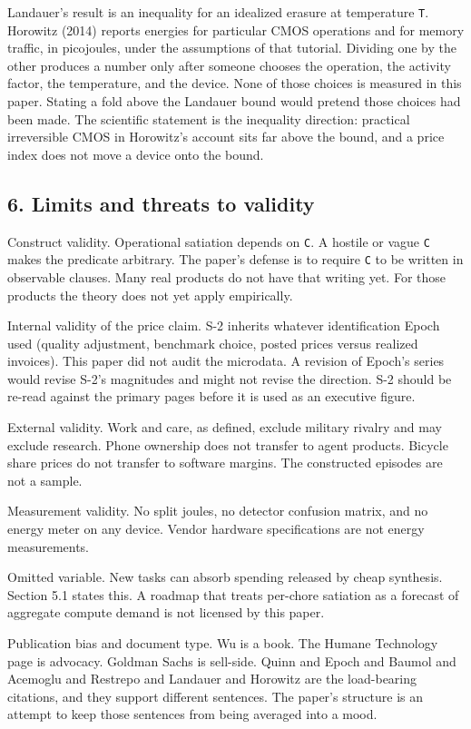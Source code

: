 \documentclass[
  10pt,
]{article}
\begin{document}
Landauer's result is an inequality for an idealized erasure at
temperature \texttt{T}. Horowitz (2014) reports energies for particular
CMOS operations and for memory traffic, in picojoules, under the
assumptions of that tutorial. Dividing one by the other produces a
number only after someone chooses the operation, the activity factor,
the temperature, and the device. None of those choices is measured in
this paper. Stating a fold above the Landauer bound would pretend those
choices had been made. The scientific statement is the inequality
direction: practical irreversible CMOS in Horowitz's account sits far
above the bound, and a price index does not move a device onto the
bound.

\subsection{6. Limits and threats to
validity}\label{limits-and-threats-to-validity}

Construct validity. Operational satiation depends on \texttt{C}. A
hostile or vague \texttt{C} makes the predicate arbitrary. The paper's
defense is to require \texttt{C} to be written in observable clauses.
Many real products do not have that writing yet. For those products the
theory does not yet apply empirically.

Internal validity of the price claim. S-2 inherits whatever
identification Epoch used (quality adjustment, benchmark choice, posted
prices versus realized invoices). This paper did not audit the
microdata. A revision of Epoch's series would revise S-2's magnitudes
and might not revise the direction. S-2 should be re-read against the
primary pages before it is used as an executive figure.

External validity. Work and care, as defined, exclude military rivalry
and may exclude research. Phone ownership does not transfer to agent
products. Bicycle share prices do not transfer to software margins. The
constructed episodes are not a sample.

Measurement validity. No split joules, no detector confusion matrix, and
no energy meter on any device. Vendor hardware specifications are not
energy measurements.

Omitted variable. New tasks can absorb spending released by cheap
synthesis. Section 5.1 states this. A roadmap that treats per-chore
satiation as a forecast of aggregate compute demand is not licensed by
this paper.

Publication bias and document type. Wu is a book. The Humane Technology
page is advocacy. Goldman Sachs is sell-side. Quinn and Epoch and Baumol
and Acemoglu and Restrepo and Landauer and Horowitz are the load-bearing
citations, and they support different sentences. The paper's structure
is an attempt to keep those sentences from being averaged into a mood.
\end{document}
